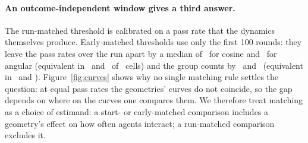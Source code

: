 \documentclass[11pt]{article}
\begin{document}
\paragraph{An outcome-independent window gives a third answer.}
The run-matched threshold is calibrated on a pass rate that the dynamics themselves produce.
Early-matched thresholds use only the first 100 rounds: they leave the pass rates over the run apart by a median of \VEarlyPassGapCos\ for cosine and \VEarlyPassGapAng\ for angular (equivalent in \VEarlyPassEquivCos\ and \VEarlyPassEquivAng\ of \VCellsPerGeom\ cells) and the group counts by \VEarlyGroupGapCos\ and \VEarlyGroupGapAng\ (equivalent in \VEarlyGroupEquivCos\ and \VEarlyGroupEquivAng).
Figure~\ref{fig:curves} shows why no single matching rule settles the question: at equal pass rates the geometries' curves do not coincide, so the gap depends on where on the curves one compares them.
We therefore treat matching as a choice of estimand: a start- or early-matched comparison includes a geometry's effect on how often agents interact; a run-matched comparison excludes it.
\end{document}

